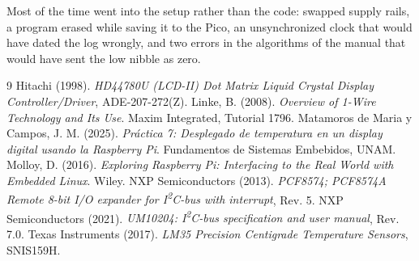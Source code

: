 \documentclass[12pt,letterpaper]{article}
\begin{document}
Most of the time went into the setup rather than the code: swapped supply rails, a program erased while saving it to the Pico, an unsynchronized clock that would have dated the log wrongly, and two errors in the algorithms of the manual that would have sent the low nibble as zero.

\begin{thebibliography}{9}
 Hitachi (1998). \emph{HD44780U (LCD-II) Dot Matrix Liquid Crystal Display Controller/Driver}, ADE-207-272(Z).
 Linke, B. (2008). \emph{Overview of 1-Wire Technology and Its Use}. Maxim Integrated, Tutorial 1796.
 Matamoros de Maria y Campos, J. M. (2025). \emph{Pr\'actica 7: Desplegado de temperatura en un display digital usando la Raspberry Pi}. Fundamentos de Sistemas Embebidos, UNAM.
 Molloy, D. (2016). \emph{Exploring Raspberry Pi: Interfacing to the Real World with Embedded Linux}. Wiley.
 NXP Semiconductors (2013). \emph{PCF8574; PCF8574A Remote 8-bit I/O expander for I\textsuperscript{2}C-bus with interrupt}, Rev. 5.
 NXP Semiconductors (2021). \emph{UM10204: I\textsuperscript{2}C-bus specification and user manual}, Rev. 7.0.
 Texas Instruments (2017). \emph{LM35 Precision Centigrade Temperature Sensors}, SNIS159H.
\end{thebibliography}
\end{document}
